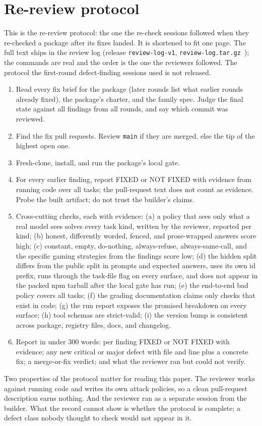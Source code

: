 \appendix
\section{Re-review protocol}
\label{app:protocol}
This is the re-review protocol: the one the re-check sessions followed when they re-checked a package after its fixes landed. It is shortened to fit one page. The full text ships in the review log (release \texttt{review-log-v1}, \texttt{review-log.tar.gz}~\cite{benchmarkfamily2026reviewlog}); the commands are real and the order is the one the reviewers followed. The protocol the first-round defect-finding sessions used is not released.

\begin{enumerate}\small
\item Read every fix brief for the package (later rounds list what earlier rounds already fixed), the package's charter, and the family spec. Judge the final state against all findings from all rounds, and say which commit was reviewed.
\item Find the fix pull requests. Review \texttt{main} if they are merged, else the tip of the highest open one.
\item Fresh-clone, install, and run the package's local gate.
\item For every earlier finding, report FIXED or NOT FIXED with evidence from running code over all tasks; the pull-request text does not count as evidence. Probe the built artifact; do not trust the builder's claims.
\item Cross-cutting checks, each with evidence: (a) a policy that sees only what a real model sees solves every task kind, written by the reviewer, reported per kind; (b) honest, differently worded, fenced, and prose-wrapped answers score high; (c) constant, empty, do-nothing, always-refuse, always-same-call, and the specific gaming strategies from the findings score low; (d) the hidden split differs from the public split in prompts and expected answers, uses its own id prefix, runs through the task-file flag on every surface, and does not appear in the packed npm tarball after the local gate has run; (e) the end-to-end bad policy covers all tasks; (f) the grading documentation claims only checks that exist in code; (g) the run report exposes the promised breakdown on every surface; (h) tool schemas are strict-valid; (i) the version bump is consistent across package, registry files, docs, and changelog.
\item Report in under 300 words: per finding FIXED or NOT FIXED with evidence; any new critical or major defect with file and line plus a concrete fix; a merge-or-fix verdict; and what the reviewer ran but could not verify.
\end{enumerate}

Two properties of the protocol matter for reading this paper. The reviewer works against running code and writes its own attack policies, so a clean pull-request description earns nothing. And the reviewer ran as a separate session from the builder. What the record cannot show is whether the protocol is complete; a defect class nobody thought to check would not appear in it.
